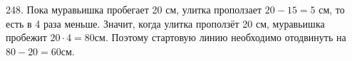 248. Пока муравьишка пробегает 20 см, улитка проползает $20-15=5$ см, то есть в 4 раза меньше. Значит, когда улитка проползёт 20 см, муравьишка пробежит $20\cdot4=80$см. Поэтому стартовую линию необходимо отодвинуть на $80-20=60$см.\\
